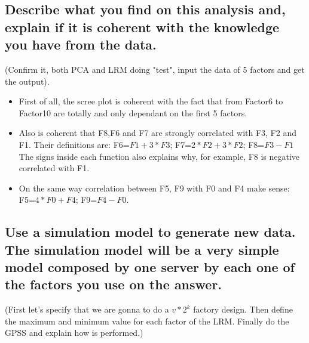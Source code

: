 \documentclass[12pt]{article}
\begin{document}
\subsection {Describe what you find on this analysis and, explain if it is coherent with the knowledge you have from the data.}
(Confirm it, both PCA and LRM doing "test", input the data of 5 factors and get the output).
\begin{itemize}
\item  First of all, the scree plot is coherent with the fact that from Factor6 to Factor10 are totally and only dependant on the first 5 factors.
\item Also is coherent that F8,F6 and F7 are strongly correlated with F3, F2 and F1. Their definitions are: F6=$F1 + 3*F3$; F7=$2*F2 + 3*F2$; F8=$F3 - F1$
\\The signs inside each function also explains why, for example, F8 is negative correlated with F1.
\item On the same way correlation between F5, F9 with F0 and F4 make sense:
F5=$4*F0 + F4$; F9=$F4 - F0$.
\end{itemize}

\subsection {Use a simulation model to generate new data. The simulation model will be a very simple model composed by one server by each one of the factors you use on the answer.}
(First let's specify that we are gonna to do a $v*2^{k}$ factory design. Then define the maximum and minimum value for each factor of the LRM. Finally do the GPSS and explain how is performed.)
\end{document}
